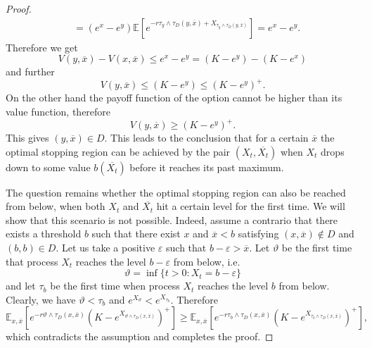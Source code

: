\documentclass[10pt,a4paper]{amsart}
\def\E{{\mathbb{E}}}
\def \R{{{\rm I{\!}\rm R}}}
\def\E{{\mathbb E}} \def\PP{\mc P} \def\Z{{\mathbb Z}} \def\R{{\mathbb R}}
\begin{document}
\begin{proof}
\begin{align*}
			& = (e^x - e^y)\E[e^{-r\tau_y\wedge\tau_D(y,\overline{x}) + X_{\tau_y\wedge\tau_D(y,\overline{x})}}] = e^x - e^y.
		\end{align*}
		Therefore we get
		\begin{equation*}
			V(y, \overline{x}) - V(x, \overline{x}) \leq  e^x - e^y = (K - e^y) - (K-e^x)
		\end{equation*}
		and further
		\begin{equation*}
			V(y, \overline{x}) \leq (K - e^y) \leq  (K - e^y)^+.
		\end{equation*}
		On the other hand the payoff function of the option cannot be higher than its value function, therefore
		\begin{equation*}
			V(y, \overline{x}) \geq  (K - e^y)^+.
		\end{equation*}
		This gives $(y, \overline{x}) \in D$. This leads to the conclusion that for a certain $\overline{x}$ the optimal stopping region can be achieved by the pair $(X_t, \overline{X_t})$ when $X_t$ drops down to some value $b(\overline{X_t})$ before it reaches its past maximum.
		
		The question remains whether the optimal stopping region can also be reached from below, when both $X_t$ and $\overline{X_t}$ hit a certain level for the first time. We will show that this scenario is not possible.
		Indeed, assume a contrario that there exists a threshold $b$ such that there exist $x$ and  $\overline{x} < b$ satisfying $(x, \overline{x}) \notin D$ and $(b,b) \in D$. Let us take a positive $\varepsilon$ such that $b - \varepsilon > \overline{x}$. Let $\vartheta$ be the first time that process $X_t$ reaches the level $b - \varepsilon$ from below, i.e.
		\begin{equation*}
			\vartheta = \inf \{ t > 0: X_t = b - \varepsilon \}
		\end{equation*}
		and let $\tau_b$ be the first time when process $X_t$  reaches the level $b$ from below. Clearly, we have $\vartheta < \tau_b$ and $e^{X_\vartheta} < e^{X_{\tau_b}}.$ Therefore
		\begin{equation*}
			\E_{x,\overline{x}}[e^{-r\vartheta\wedge\tau_D(x,\overline{x})}(K - e^{X_{\vartheta\wedge\tau_D(x,\overline{x})}})^+] \geq \E_{x,\overline{x}}[e^{-r\tau_b\wedge\tau_D(x,\overline{x})}(K - e^{X_{\tau_b\wedge\tau_D(x,\overline{x})}})^+],
		\end{equation*}
		which contradicts the assumption and completes the proof.
		
	\end{proof}
	
\end{document}
